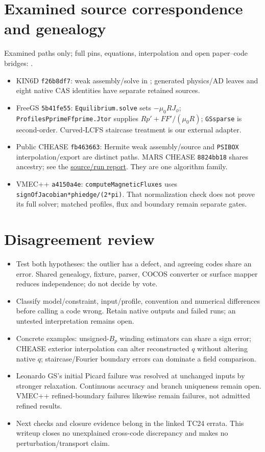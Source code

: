 \documentclass[11pt,a4paper]{article}
\newcommand{\pp}{p'}
\newcommand{\tc}{https://gitlab.tugraz.at/plasma/proj/ntv/iter_tc24/-/blob/plan/circular-tokamak-benchmark-20261007/}
\begin{document}
\section*{Examined source correspondence and genealogy}
Examined paths only; full pins, equations, interpolation and open paper--code bridges: .
\begin{itemize}
\item KIN6D \texttt{f26b8df7}: weak assembly/solve in ; generated physics/AD leaves and eight native CAS identities have separate retained sources.
\item FreeGS \texttt{5b41fe55}: \texttt{Equilibrium.solve} sets $-\mu_0RJ_\phi$; \texttt{ProfilesPprimeFfprime.Jtor} supplies $R\pp+FF'/(\mu_0R)$; \texttt{GSsparse} is second-order. Curved-LCFS staircase treatment is our external adapter.
\item Public CHEASE \texttt{fb463663}: Hermite weak assembly/source and \texttt{PSIBOX} interpolation/export are distinct paths. MARS CHEASE \texttt{8824bb18} shares ancestry; see the \href{\tc review/EQUILIBRIUM_CHEASE.md}{source/run report}. They are one algorithm family.
\item VMEC++ \texttt{a4150a4e}: \texttt{computeMagneticFluxes} uses \texttt{signOfJacobian*phiedge/(2*pi)}. That normalization check does not prove its full solver; matched profiles, flux and boundary remain separate gates.
\end{itemize}

\section*{Disagreement review}
\begin{itemize}
\item Test both hypotheses: the outlier has a defect, and agreeing codes share an error. Shared genealogy, fixture, parser, COCOS converter or surface mapper reduces independence; do not decide by vote.
\item Classify model/constraint, input/profile, convention and numerical differences before calling a code wrong. Retain native outputs and failed runs; an untested interpretation remains open.
\item Concrete examples: unsigned-$B_p$ winding estimators can share a sign error; CHEASE exterior interpolation can alter reconstructed $q$ without altering native $q$; staircase/Fourier boundary errors can dominate a field comparison.
\item Leonardo GS's initial Picard failure was resolved at unchanged inputs by stronger relaxation. Continuous accuracy and branch uniqueness remain open. VMEC++ refined-boundary failures likewise remain failures, not admitted refined results.
\item Next checks and closure evidence belong in the linked TC24 errata. This writeup closes no unexplained cross-code discrepancy and makes no perturbation/transport claim.
\end{itemize}
\end{document}
